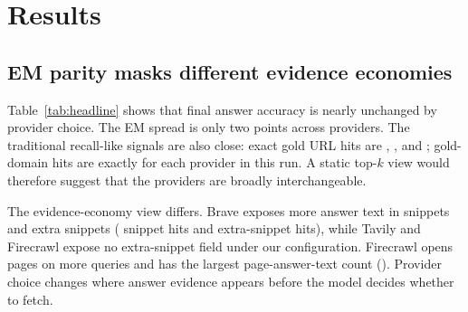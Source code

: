 \section{Results}
\label{sec:results}

\subsection{EM parity masks different evidence economies}

Table~\ref{tab:headline} shows that final answer accuracy is nearly unchanged by provider choice. The EM spread is only two points across providers. The traditional recall-like signals are also close: exact gold URL hits are \BraveGoldURLExact{}, \TavilyGoldURLExact{}, and \FirecrawlGoldURLExact{}; gold-domain hits are exactly \BraveGoldDomain{} for each provider in this run. A static top-$k$ view would therefore suggest that the providers are broadly interchangeable.

The evidence-economy view differs. Brave exposes more answer text in snippets and extra snippets (\BraveAnswerSnippet{} snippet hits and \BraveAnswerExtra{} extra-snippet hits), while Tavily and Firecrawl expose no extra-snippet field under our configuration. Firecrawl opens pages on more queries and has the largest page-answer-text count (\FirecrawlAnswerPage{}). Provider choice changes where answer evidence appears before the model decides whether to fetch.


